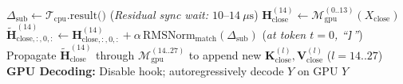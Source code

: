 \documentclass[10pt,twocolumn]{article}
\begin{document}
\begin{algorithm}[t]
\begin{algorithmic}[1]
\STATE \hspace{0.7em} $\Delta_{\text{sub}} \leftarrow \mathcal{T}_{\text{cpu}}\text{.result()}$ \quad (\emph{Residual sync wait: $10\text{--}14\ \mu\text{s}$})
\STATE \hspace{0.7em} $\mathbf{H}_{\text{close}}^{(14)} \leftarrow \mathcal{M}_{\text{gpu}}^{(0..13)}(X_{\text{close}})$
\STATE \hspace{0.7em} $\tilde{\mathbf{H}}_{\text{close},:,0,:}^{(14)} \leftarrow \mathbf{H}_{\text{close},:,0,:}^{(14)} + \alpha \, \text{RMSNorm}_{\text{match}}(\Delta_{\text{sub}})$ \quad (\emph{at token $t=0$, ``\texttt{]}''})
\STATE \hspace{0.7em} Propagate $\tilde{\mathbf{H}}_{\text{close}}^{(14)}$ through $\mathcal{M}_{\text{gpu}}^{(14..27)}$ to append new $\mathbf{K}_{\text{close}}^{(l)}, \mathbf{V}_{\text{close}}^{(l)}$ ($l=14..27$)
\STATE \textbf{GPU Decoding:} Disable hook; autoregressively decode $Y$ on GPU
\RETURN $Y$
\end{algorithmic}
\end{algorithm}
\end{document}
